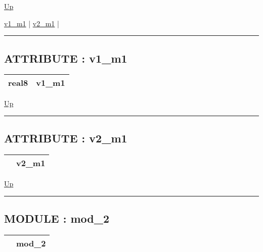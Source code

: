 \hyperlink{ecldoc:intest.inintest.example_2}{Up}

\par


\hyperlink{ecldoc:intest.inintest.example_2.mod_1.v1_m1}{v1\_m1}  |
\hyperlink{ecldoc:intest.inintest.example_2.mod_1.v2_m1}{v2\_m1}  |

\rule{\textwidth}{0.4pt}

\subsection*{ATTRIBUTE : v1\_m1}
\hypertarget{ecldoc:intest.inintest.example_2.mod_1.v1_m1}{}

{\renewcommand{\arraystretch}{1.5}
\begin{tabularx}{\textwidth}{|>{\raggedright\arraybackslash}l|X|}
\hline
\hspace{0pt}real8 & v1\_m1 \\
\hline
\end{tabularx}
}

\hyperlink{ecldoc:intest.inintest.example_2.mod_1}{Up}

\par


\rule{\textwidth}{0.4pt}
\subsection*{ATTRIBUTE : v2\_m1}
\hypertarget{ecldoc:intest.inintest.example_2.mod_1.v2_m1}{}

{\renewcommand{\arraystretch}{1.5}
\begin{tabularx}{\textwidth}{|>{\raggedright\arraybackslash}l|X|}
\hline
\hspace{0pt} & v2\_m1 \\
\hline
\end{tabularx}
}

\hyperlink{ecldoc:intest.inintest.example_2.mod_1}{Up}

\par


\rule{\textwidth}{0.4pt}


\subsection*{MODULE : mod\_2}
\hypertarget{ecldoc:intest.inintest.example_2.mod_2}{}

{\renewcommand{\arraystretch}{1.5}
\begin{tabularx}{\textwidth}{|>{\raggedright\arraybackslash}l|X|}
\hline
\hspace{0pt} & mod\_2 \\
\hline
\end{tabularx}
}

